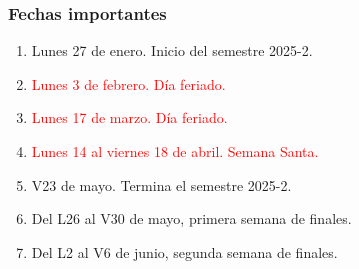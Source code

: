 \documentclass[12pt]{beamer}
\begin{document}
\begin{frame}
\frametitle{Fechas importantes}
\begin{enumerate}[<+->]
\setlength\itemsep{1pt}
\item Lunes 27 de enero. Inicio del semestre 2025-2.
\item \textcolor{red}{Lunes 3 de febrero. Día feriado.}
\item \textcolor{red}{Lunes 17 de marzo. Día feriado.}
\item \textcolor{red}{Lunes 14 al viernes 18 de abril. Semana Santa.}
\item V23 de mayo. Termina el semestre 2025-2.
\item Del L26 al V30 de mayo, primera semana de finales.
\item Del L2 al V6 de junio, segunda semana de finales.
\end{enumerate}
\end{frame}
\end{document}
